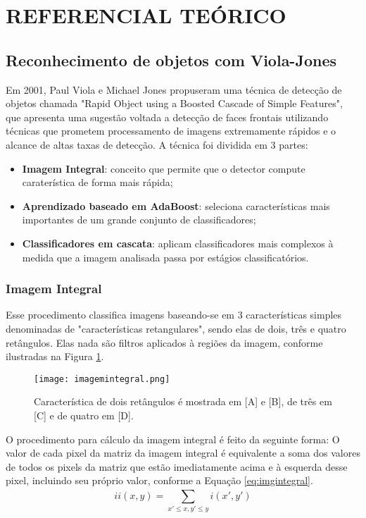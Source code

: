 \documentclass[a4paper,12pt]{article}
\begin{document}
\section{REFERENCIAL TEÓRICO}
\subsection{Reconhecimento de objetos com Viola-Jones}
\hspace{4ex}Em 2001, Paul Viola e Michael Jones\cite{vj} propuseram uma técnica de detecção de objetos chamada "Rapid Object using a Boosted Cascade of Simple Features", que apresenta  uma sugestão voltada a detecção de faces frontais utilizando técnicas que prometem processamento de imagens extremamente rápidos e o alcance de altas taxas de detecção. A técnica foi dividida em 3 partes: 
\begin{itemize}
	\item {\bf Imagem Integral}: conceito que permite que o detector compute caraterística de forma mais rápida;
	\item {\bf Aprendizado baseado em AdaBoost}: seleciona características mais importantes de um grande conjunto de classificadores;
	\item {\bf Classificadores em cascata}: aplicam classificadores mais complexos à medida que a imagem analisada passa por estágios classificatórios.
\end{itemize}
\subsubsection{Imagem Integral}
\hspace{4ex} Esse procedimento classifica imagens baseando-se em 3 características simples denominadas de "características retangulares", sendo elas de dois, três e quatro retângulos. Elas nada são filtros aplicados à regiões da imagem, conforme ilustradas na Figura \ref{imagemintegral}.

\begin{figure}[h!]
	\centering
	\texttt{[image: imagemintegral.png]}
	\caption{Característica de dois retângulos é mostrada em [A] e [B], de três em [C] e de quatro em [D].}
	\label{imagemintegral}
\end{figure}
 
\hspace{4ex}O procedimento para cálculo da imagem integral é feito da seguinte forma: O valor de cada pixel da matriz da imagem integral é equivalente a soma dos valores de todos os pixels da matriz que estão imediatamente acima e à esquerda desse pixel, incluindo seu próprio valor, conforme a Equação \ref{eq:imgintegral}.
\begin{equation} \label{eq:imgintegral}
	ii(x,y)=\sum_{x'\le x,y'\le y}^{} i(x',y')
\end{equation}
\end{document}

